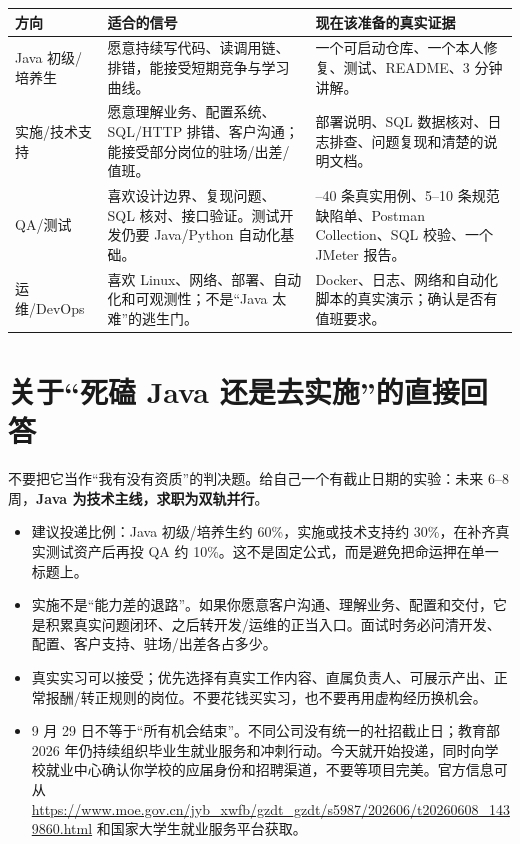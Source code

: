 \documentclass[a4paper,11pt]{article}
\begin{document}
\begin{longtable}{>{\raggedright\arraybackslash}p{} >{\raggedright\arraybackslash}p{} >{\raggedright\arraybackslash}p{}}
\textbf{方向} & \textbf{适合的信号} & \textbf{现在该准备的真实证据} \\
\hline
Java 初级/培养生 & 愿意持续写代码、读调用链、排错，能接受短期竞争与学习曲线。 & 一个可启动仓库、一个本人修复、测试、README、3 分钟讲解。 \\
实施/技术支持 & 愿意理解业务、配置系统、SQL/HTTP 排错、客户沟通；能接受部分岗位的驻场/出差/值班。 & 部署说明、SQL 数据核对、日志排查、问题复现和清楚的说明文档。 \\
QA/测试 & 喜欢设计边界、复现问题、SQL 核对、接口验证。测试开发仍要 Java/Python 自动化基础。 & 20--40 条真实用例、5--10 条规范缺陷单、Postman Collection、SQL 校验、一个 JMeter 报告。 \\
运维/DevOps & 喜欢 Linux、网络、部署、自动化和可观测性；不是“Java 太难”的逃生门。 & Docker、日志、网络和自动化脚本的真实演示；确认是否有值班要求。 \\
\end{longtable}

\section{关于“死磕 Java 还是去实施”的直接回答}

不要把它当作“我有没有资质”的判决题。给自己一个有截止日期的实验：未来 6--8 周，\textbf{Java 为技术主线，求职为双轨并行}。

\begin{itemize}
  \item 建议投递比例：Java 初级/培养生约 60\%，实施或技术支持约 30\%，在补齐真实测试资产后再投 QA 约 10\%。这不是固定公式，而是避免把命运押在单一标题上。
  \item 实施不是“能力差的退路”。如果你愿意客户沟通、理解业务、配置和交付，它是积累真实问题闭环、之后转开发/运维的正当入口。面试时务必问清开发、配置、客户支持、驻场/出差各占多少。
  \item 真实实习可以接受；优先选择有真实工作内容、直属负责人、可展示产出、正常报酬/转正规则的岗位。不要花钱买实习，也不要再用虚构经历换机会。
  \item 9 月 29 日不等于“所有机会结束”。不同公司没有统一的社招截止日；教育部 2026 年仍持续组织毕业生就业服务和冲刺行动。今天就开始投递，同时向学校就业中心确认你学校的应届身份和招聘渠道，不要等项目完美。官方信息可从 \url{https://www.moe.gov.cn/jyb_xwfb/gzdt_gzdt/s5987/202606/t20260608_1439860.html} 和国家大学生就业服务平台获取。
\end{itemize}
\end{document}
